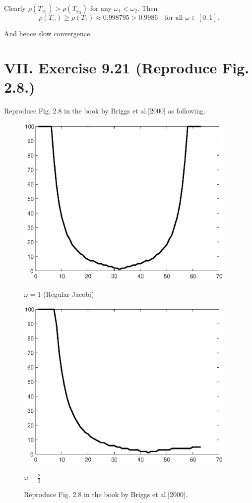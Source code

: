 \documentclass[twoside,a4paper]{article}
\begin{document}
Clearly $\rho(T_{\omega_1})>\rho(T_{\omega_2})$ for any $\omega_1<\omega_2$. Then
\begin{equation*}
    \rho(T_\omega)\geq \rho(T_1)\approx 0.998795> 0.9986 \quad \text{for all } \omega\in[0,1].
\end{equation*}

And hence slow convergence.

\section*{VII. Exercise 9.21 (Reproduce Fig. 2.8.)}
\;\;\;\;\;\;Reproduce Fig. 2.8 in the book by Briggs et al.[2000] as following.
\begin{figure}[H]
    \centering
    \begin{minipage}[t]{0.33\textwidth}
        \centering
        \includegraphics[width=0.95\textwidth]{figure/ex9_21_1.eps}
        \caption*{$\omega=1$ (Regular Jacobi)}
    \end{minipage}
    \begin{minipage}[t]{0.33\textwidth}
        \centering
        \includegraphics[width=0.95\textwidth]{figure/ex9_21_2.eps}
        \caption*{$\omega=\frac{2}{3}$}
    \end{minipage}
    \caption{Reproduce Fig. 2.8 in the book by Briggs et al.[2000].}
\end{figure}
\end{document}
